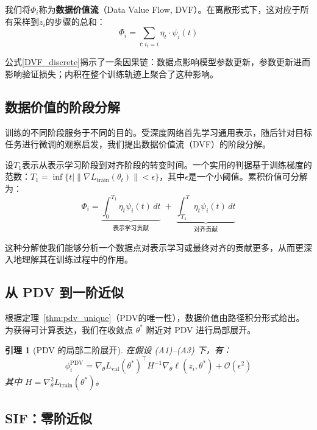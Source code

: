 \documentclass[12pt,a4paper]{ctexart}
\theoremstyle{definition}
\theoremstyle{plain}
\newtheorem{lemma}{引理}[section]
\begin{document}
我们将\(\Phi_i\)称为\textbf{数据价值流}（Data Value Flow, DVF）。在离散形式下，这对应于所有采样到\(z_i\)的步骤的总和：
\begin{equation}
\label{DVF_discrete}
\Phi_i = \sum_{t: i_t = i} \eta_t \cdot \psi_i(t)
\end{equation}

公式\eqref{DVF_discrete}揭示了一条因果链：数据点影响模型参数更新，参数更新进而影响验证损失；内积在整个训练轨迹上聚合了这种影响。

\subsection{数据价值的阶段分解}

训练的不同阶段服务于不同的目的。受深度网络首先学习通用表示，随后针对目标任务进行微调的观察启发\cite{zeiler2014visualizing}，我们提出数据价值流（DVF）的阶段分解。

设\(T_1\)表示从表示学习阶段到对齐阶段的转变时间。一个实用的判据基于训练梯度的范数：\(T_1 = \inf\{ t \mid \|\nabla L_{\text{train}}(\theta_t)\| < \epsilon \}\)，其中\(\epsilon\)是一个小阈值。累积价值可分解为：
\begin{equation}
\Phi_i = \underbrace{\int_{0}^{T_1} \eta_t \psi_i(t) \, dt}_{\text{表示学习贡献}} \;+\; \underbrace{\int_{T_1}^{T} \eta_t \psi_i(t) \, dt}_{\text{对齐贡献}}
\end{equation}

这种分解使我们能够分析一个数据点对表示学习或最终对齐的贡献更多，从而更深入地理解其在训练过程中的作用。

\subsection{从 PDV 到一阶近似}

根据定理~\ref{thm:pdv_unique}（PDV的唯一性），数据价值由路径积分形式给出。为获得可计算表达，我们在收敛点 \(\theta^*\) 附近对 PDV 进行局部展开。

\begin{lemma}[PDV 的局部二阶展开]
\label{lem:pdv_expansion}
在假设 (A1)--(A3) 下，有：
\begin{equation}
\phi_i^{\mathrm{PDV}} = \nabla_\theta L_{\mathrm{val}}(\theta^*)^\top H^{-1} \nabla_\theta \ell(z_i, \theta^*) + \mathcal{O}(\epsilon^2)
\label{eq:pdv_expansion}
\end{equation}
其中 \(H = \nabla_\theta^2 L_{\mathrm{train}}(\theta^*)\)。
\end{lemma}

\subsection{SIF：零阶近似}
\end{document}
